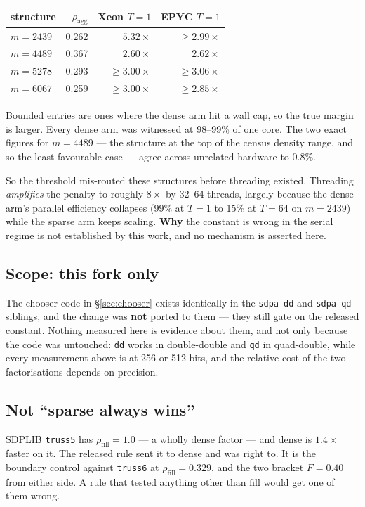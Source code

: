 \documentclass[11pt]{article}
\newcommand{\aggr}{\rho_{\mathrm{agg}}}
\newcommand{\rfill}{\rho_{\mathrm{fill}}}
\newcommand{\code}[1]{\texttt{#1}}
\begin{document}
\begin{center}
\begin{tabular}{lrrr}
\toprule
structure & $\aggr$ & Xeon $T{=}1$ & EPYC $T{=}1$ \\
\midrule
$m=2439$ & 0.262 & $5.32\times$ & $\ge 2.99\times$ \\
$m=4489$ & 0.367 & $2.60\times$ & $2.62\times$ \\
$m=5278$ & 0.293 & $\ge 3.00\times$ & $\ge 3.06\times$ \\
$m=6067$ & 0.259 & $\ge 3.00\times$ & $\ge 2.85\times$ \\
\bottomrule
\end{tabular}
\end{center}

Bounded entries are ones where the dense arm hit a wall cap, so the true margin is larger. Every
dense arm was witnessed at 98--99\% of one core. The two exact figures for $m=4489$ --- the
structure at the top of the census density range, and so the least favourable case --- agree
across unrelated hardware to $0.8\%$.

So the threshold mis-routed these structures before threading existed. Threading \emph{amplifies}
the penalty to roughly $8\times$ by 32--64 threads, largely because the dense arm's parallel
efficiency collapses (99\% at $T=1$ to 15\% at $T=64$ on $m=2439$) while the sparse arm keeps
scaling. \textbf{Why} the constant is wrong in the serial regime is not established by this work,
and no mechanism is asserted here.

\subsection{Scope: this fork only}

The chooser code in \S\ref{sec:chooser} exists identically in the \code{sdpa-dd} and
\code{sdpa-qd} siblings, and the change was \textbf{not} ported to them --- they still gate on the
released constant. Nothing measured here is evidence about them, and not only because the code was
untouched: \code{dd} works in double-double and \code{qd} in quad-double, while every measurement
above is at 256 or 512 bits, and the relative cost of the two factorisations depends on precision.

\subsection{Not ``sparse always wins''}

SDPLIB \code{truss5} has $\rfill = 1.0$ --- a wholly dense factor --- and dense is $1.4\times$
faster on it. The released rule sent it to dense and was right to. It is the boundary control
against \code{truss6} at $\rfill = 0.329$, and the two bracket $F=0.40$ from either side. A rule
that tested anything other than fill would get one of them wrong.
\end{document}
